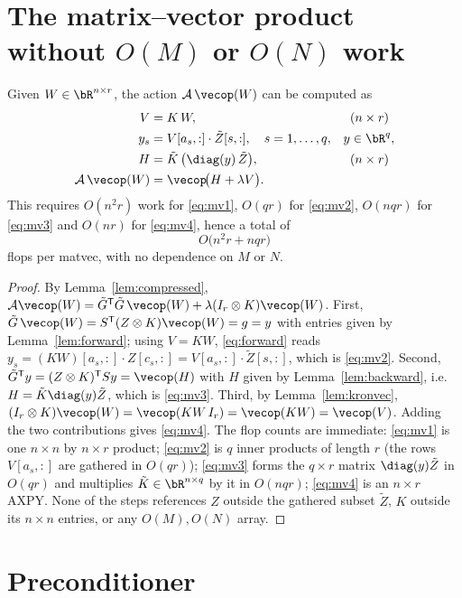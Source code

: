 \section{The matrix--vector product without $O(M)$ or $O(N)$ work}

\begin{proposition}\label{prop:matvec}
Given $W\in\bR^{n\times r}$, the action $\mathcal A\,\vecop(W)$ can be computed as
\begin{align}
  V &= K\,W, & &(n\times r)\label{eq:mv1}\\
  y_s &= V[a_s,:]\cdot \tilde Z[s,:],\quad s=1,\dots,q,
     & y&\in\bR^q,\label{eq:mv2}\\
  H &= \tilde K\,\big(\diag(y)\,\tilde Z\big), & &(n\times r)\label{eq:mv3}\\
  \mathcal A\,\vecop(W) &= \vecop\!\big(H+\lambda V\big). & &\label{eq:mv4}
\end{align}
This requires $O(n^2r)$ work for \eqref{eq:mv1}, $O(qr)$ for \eqref{eq:mv2},
$O(nqr)$ for \eqref{eq:mv3} and $O(nr)$ for \eqref{eq:mv4}, hence a total of
\[
  O\big(n^2 r+nqr\big)
\]
flops per matvec, with no dependence on $M$ or $N$.
\end{proposition}
\begin{proof}
By Lemma~\ref{lem:compressed}, $\mathcal A\vecop(W)=\tilde G^{\mathsf T}\tilde G\,
\vecop(W)+\lambda(I_r\otimes K)\vecop(W)$.
First, $\tilde G\,\vecop(W)=S^{\mathsf T}(Z\otimes K)\vecop(W)=g=y$ with entries given
by Lemma~\ref{lem:forward}; using $V=KW$, \eqref{eq:forward} reads
$y_s=(KW)[a_s,:]\cdot Z[c_s,:]=V[a_s,:]\cdot\tilde Z[s,:]$, which is \eqref{eq:mv2}.
Second, $\tilde G^{\mathsf T}y=(Z\otimes K)^{\mathsf T}S y=\vecop(H)$ with $H$ given by
Lemma~\ref{lem:backward}, i.e.\ $H=\tilde K\diag(y)\tilde Z$, which is \eqref{eq:mv3}.
Third, by Lemma~\ref{lem:kronvec}, $(I_r\otimes K)\vecop(W)=\vecop(KW\,I_r)=\vecop(KW)
=\vecop(V)$. Adding the two contributions gives \eqref{eq:mv4}. The flop counts are
immediate: \eqref{eq:mv1} is one $n\times n$ by $n\times r$ product; \eqref{eq:mv2} is
$q$ inner products of length $r$ (the rows $V[a_s,:]$ are gathered in $O(qr)$);
\eqref{eq:mv3} forms the $q\times r$ matrix $\diag(y)\tilde Z$ in $O(qr)$ and multiplies
$\tilde K\in\bR^{n\times q}$ by it in $O(nqr)$; \eqref{eq:mv4} is an $n\times r$ AXPY.
None of the steps references $Z$ outside the gathered subset $\tilde Z$, $K$ outside its
$n\times n$ entries, or any $O(M),O(N)$ array.
\end{proof}

\section{Preconditioner}

